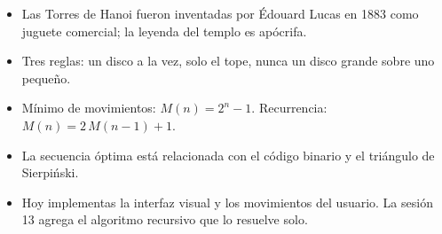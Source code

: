 \documentclass[12pt, oneside]{article}
\begin{document}
\begin{recuerda}
\begin{itemize}
  \item Las Torres de Hanoi fueron inventadas por Édouard Lucas en 1883
        como juguete comercial; la leyenda del templo es apócrifa.
  \item Tres reglas: un disco a la vez, solo el tope, nunca un disco
        grande sobre uno pequeño.
  \item Mínimo de movimientos: $M(n) = 2^n - 1$.
        Recurrencia: $M(n) = 2\,M(n-1) + 1$.
  \item La secuencia óptima está relacionada con el código binario y
        el triángulo de Sierpiński.
  \item Hoy implementas la interfaz visual y los movimientos del usuario.
        La sesión 13 agrega el algoritmo recursivo que lo resuelve solo.
\end{itemize}
\end{recuerda}
\end{document}
